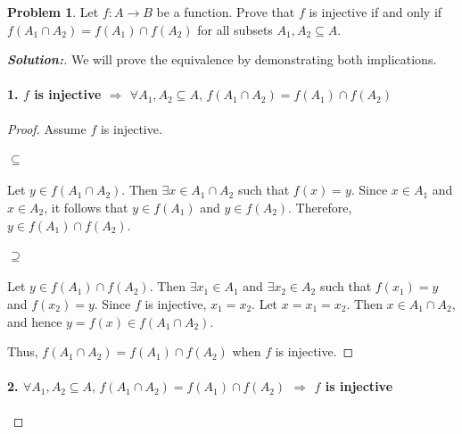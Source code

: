 \documentclass[12pt]{article}
\theoremstyle{definition}\newtheorem{problem}{Problem}
\newenvironment{solution}{\begin{proof}[\bfseries\textup{Solution:}]}{\end{proof}}
\begin{document}
\newpage
\begin{problem}
Let $f:A\to B$ be a function.  Prove that $f$ is injective if and only if $f(A_1\cap A_2) = f(A_1) \cap f(A_2)$ for all subsets $A_1,A_2\subseteq A$.
\end{problem}
\begin{solution}
    We will prove the equivalence by demonstrating both implications.

    \paragraph{1. \( f \) is injective \( \Rightarrow \) \( \forall A_1, A_2 \subseteq A,\, f(A_1 \cap A_2) = f(A_1) \cap f(A_2) \)}
    
    \begin{proof}
    Assume \( f \) is injective.
    
    \paragraph{\( \subseteq \)}
    
    Let \( y \in f(A_1 \cap A_2) \). Then \( \exists x \in A_1 \cap A_2 \) such that \( f(x) = y \). Since \( x \in A_1 \) and \( x \in A_2 \), it follows that \( y \in f(A_1) \) and \( y \in f(A_2) \). Therefore, \( y \in f(A_1) \cap f(A_2) \).
    
    \paragraph{\( \supseteq \)}
    
    Let \( y \in f(A_1) \cap f(A_2) \). Then \( \exists x_1 \in A_1 \) and \( \exists x_2 \in A_2 \) such that \( f(x_1) = y \) and \( f(x_2) = y \). Since \( f \) is injective, \( x_1 = x_2 \). Let \( x = x_1 = x_2 \). Then \( x \in A_1 \cap A_2 \), and hence \( y = f(x) \in f(A_1 \cap A_2) \).
    
    
    
    Thus, \( f(A_1 \cap A_2) = f(A_1) \cap f(A_2) \) when \( f \) is injective.
    \end{proof}
    
    \paragraph{2. \( \forall A_1, A_2 \subseteq A,\, f(A_1 \cap A_2) = f(A_1) \cap f(A_2) \) \( \Rightarrow \) \( f \) is injective}
    

\end{solution}
\end{document}
